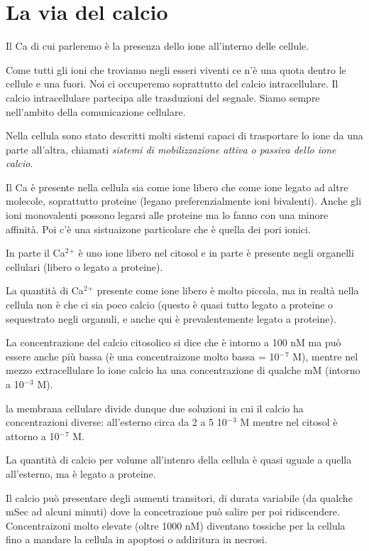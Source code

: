 \documentclass[]{article}
\date{}
\begin{document}
\section{La via del calcio}\label{la-via-del-calcio}

Il Ca di cui parleremo è la presenza dello ione all'interno delle
cellule.

Come tutti gli ioni che troviamo negli esseri viventi ce n'è una quota
dentro le cellule e una fuori. Noi ci occuperemo soprattutto del calcio
intracellulare. Il calcio intracellulare partecipa alle trasduzioni del
segnale. Siamo sempre nell'ambito della comunicazione cellulare.

Nella cellula sono stato descritti molti sistemi capaci di trasportare
lo ione da una parte all'altra, chiamati \emph{sistemi di mobilizzazione
attiva o passiva dello ione calcio}.

Il Ca è presente nella cellula sia come ione libero che come ione legato
ad altre molecole, soprattutto proteine (legano preferenzialmente ioni
bivalenti). Anche gli ioni monovalenti possono legarsi alle proteine ma
lo fanno con una minore affinità. Poi c'è una sistuaizone particolare
che è quella dei pori ionici.

In parte il Ca\(^2\)\(^+\) è uno ione libero nel citosol e in parte è
presente negli organelli cellulari (libero o legato a proteine).

La quantità di Ca\(^2\)\(^+\) presente come ione libero è molto piccola,
ma in realtà nella cellula non è che ci sia poco calcio (questo è quasi
tutto legato a proteine o sequestrato negli organuli, e anche qui è
prevalentemente legato a proteine).

La concentrazione del calcio citosolico si dice che è intorno a 100 nM
ma può essere anche più bassa (è una concentraizone molto bassa =
10\(^-\)\(^7\) M), mentre nel mezzo extracellulare lo ione calcio ha una
concentrazione di qualche mM (intorno a 10\(^-\)\(^3\) M).

la membrana cellulare divide dunque due soluzioni in cui il calcio ha
concentrazioni diverse: all'esterno circa da 2 a 5 10\(^-\)\(^3\) M
mentre nel citosol è attorno a 10\(^-\)\(^7\) M.

La quantità di calcio per volume all'intenro della cellula è quasi
uguale a quella all'esterno, ma è legato a proteine.

Il calcio può presentare degli aumenti transitori, di durata variabile
(da qualche mSec ad alcuni minuti) dove la concetrazione può salire per
poi ridiscendere. Concentraizoni molto elevate (oltre 1000 nM) diventano
tossiche per la cellula fino a mandare la cellula in apoptosi o
addiritura in necrosi.
\end{document}

